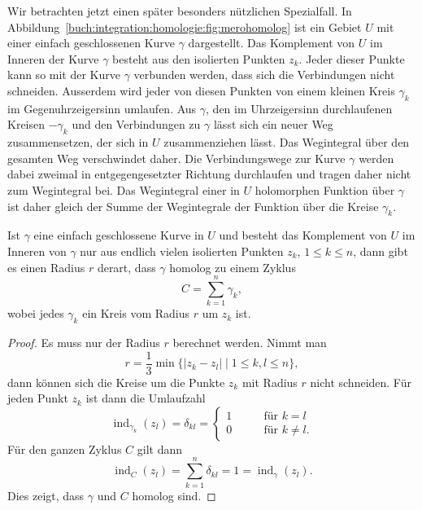 Wir betrachten jetzt einen später besonders nützlichen Spezialfall.
%
In Abbildung~\ref{buch:integration:homologie:fig:merohomolog}
ist ein Gebiet $U$ mit einer einfach geschlossenen Kurve
$\gamma$ dargestellt.
Das Komplement von $U$ im Inneren der Kurve $\gamma$ besteht
aus den isolierten Punkten $z_k$.
Jeder dieser Punkte kann so mit der Kurve $\gamma$ verbunden werden,
dass sich die Verbindungen nicht schneiden.
Ausserdem wird jeder von diesen Punkten von einem kleinen Kreis $\gamma_k$
im Gegenuhrzeigersinn umlaufen.
Aus $\gamma$, den im Uhrzeigersinn durchlaufenen Kreisen $-\gamma_k$
und den Verbindungen zu $\gamma$ lässt sich ein neuer Weg zusammensetzen,
der sich in $U$ zusammenziehen lässt.
Das Wegintegral über den gesamten Weg verschwindet daher.
Die Verbindungswege zur Kurve $\gamma$ werden dabei zweimal in
entgegengesetzter Richtung durchlaufen und tragen daher nicht zum
Wegintegral bei.
Das Wegintegral einer in $U$ holomorphen Funktion über $\gamma$
ist daher gleich der Summe der Wegintegrale der Funktion
über die Kreise $\gamma_k$.

\begin{satz}
\label{buch:integration:homologie:satz:pfadpunkte}
Ist $\gamma$ eine einfach geschlossene Kurve in $U$ und besteht das Komplement
von $U$ im Inneren von $\gamma$ nur aus endlich vielen isolierten Punkten
$z_k$, $1\le k\le n$, dann gibt es einen Radius $r$ derart, dass $\gamma$
homolog zu einem Zyklus 
\[
C
=
\sum_{k=1}^n \gamma_k,
\]
wobei jedes $\gamma_k$ ein Kreis vom Radius $r$ um $z_k$ ist.
\end{satz}

\begin{proof}
Es muss nur der Radius $r$ berechnet werden.
Nimmt man
\[
r
=
\frac13
\min \{ |z_k-z_l|\mid 1\le k,l\le n\},
\]
dann können sich die Kreise um die Punkte $z_k$ mit Radius $r$ nicht
schneiden.
Für jeden Punkt $z_k$ ist dann die Umlaufzahl 
\[
\operatorname{ind}_{\gamma_k}(z_l)
=
\delta_{kl}
=
\begin{cases}
1&\qquad\text{für $k=l$}\\
0&\qquad\text{für $k\ne l$.}
\end{cases}
\]
Für den ganzen Zyklus $C$ gilt dann
\[
\operatorname{ind}_C(z_l)
=
\sum_{k=1}^n
\delta_{kl}
=
1
=
\operatorname{ind}_\gamma(z_l).
\]
Dies zeigt, dass $\gamma$ und $C$ homolog sind.
\end{proof}





